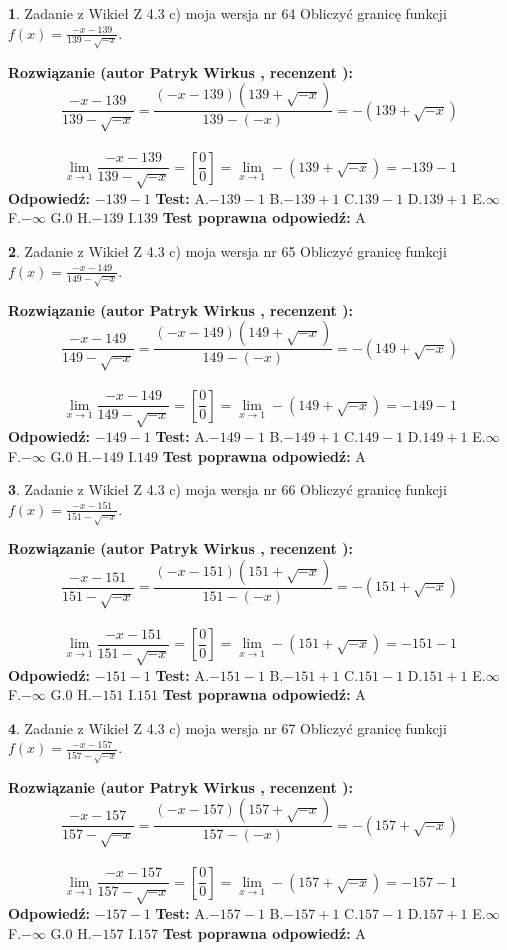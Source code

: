 \documentclass[12pt, a4paper]{article}
\theoremstyle{definition} %
\newtheorem{zad}{}
\newcommand{\zadStart}[1]{\begin{zad}#1\newline}
\newcommand{\zadStop}{\end{zad}}
\newcommand{\rozwStart}[2]{\noindent \textbf{Rozwiązanie (autor #1 , recenzent #2): }\newline}
\newcommand{\rozwStop}{\newline}
\newcommand{\odpStart}{\noindent \textbf{Odpowiedź:}\newline}
\newcommand{\odpStop}{\newline}
\newcommand{\testStart}{\noindent \textbf{Test:}\newline}
\newcommand{\testStop}{\newline}
\newcommand{\kluczStart}{\noindent \textbf{Test poprawna odpowiedź:}\newline}
\newcommand{\kluczStop}{\newline}
\begin{document}
\zadStart{Zadanie z Wikieł Z 4.3 c) moja wersja nr 64}
Obliczyć granicę funkcji $f(x)=\frac{-x-139}{139-\sqrt{-x}}$.
\zadStop
\rozwStart{Patryk Wirkus}{}
$$\frac{-x-139}{139-\sqrt{-x}}=\frac{(-x-139)(139+\sqrt{-x})}{139-(-x)}=-(139+\sqrt{-x})$$
\\
$$\lim\limits_{x\to1}\frac{-x-139}{139-\sqrt{-x}}=[\frac{0}{0}]=\lim\limits_{x\to1}-(139+\sqrt{-x}) =-139-1$$
\rozwStop
\odpStart
$-139-1$
\odpStop
\testStart
A.$-139-1$
B.$-139+1$
C.$139-1$
D.$139+1$
E.$\infty$
F.$-\infty$
G.$0$
H.$-139$
I.$139$
\testStop
\kluczStart
A
\kluczStop



\zadStart{Zadanie z Wikieł Z 4.3 c) moja wersja nr 65}
Obliczyć granicę funkcji $f(x)=\frac{-x-149}{149-\sqrt{-x}}$.
\zadStop
\rozwStart{Patryk Wirkus}{}
$$\frac{-x-149}{149-\sqrt{-x}}=\frac{(-x-149)(149+\sqrt{-x})}{149-(-x)}=-(149+\sqrt{-x})$$
\\
$$\lim\limits_{x\to1}\frac{-x-149}{149-\sqrt{-x}}=[\frac{0}{0}]=\lim\limits_{x\to1}-(149+\sqrt{-x}) =-149-1$$
\rozwStop
\odpStart
$-149-1$
\odpStop
\testStart
A.$-149-1$
B.$-149+1$
C.$149-1$
D.$149+1$
E.$\infty$
F.$-\infty$
G.$0$
H.$-149$
I.$149$
\testStop
\kluczStart
A
\kluczStop



\zadStart{Zadanie z Wikieł Z 4.3 c) moja wersja nr 66}
Obliczyć granicę funkcji $f(x)=\frac{-x-151}{151-\sqrt{-x}}$.
\zadStop
\rozwStart{Patryk Wirkus}{}
$$\frac{-x-151}{151-\sqrt{-x}}=\frac{(-x-151)(151+\sqrt{-x})}{151-(-x)}=-(151+\sqrt{-x})$$
\\
$$\lim\limits_{x\to1}\frac{-x-151}{151-\sqrt{-x}}=[\frac{0}{0}]=\lim\limits_{x\to1}-(151+\sqrt{-x}) =-151-1$$
\rozwStop
\odpStart
$-151-1$
\odpStop
\testStart
A.$-151-1$
B.$-151+1$
C.$151-1$
D.$151+1$
E.$\infty$
F.$-\infty$
G.$0$
H.$-151$
I.$151$
\testStop
\kluczStart
A
\kluczStop



\zadStart{Zadanie z Wikieł Z 4.3 c) moja wersja nr 67}
Obliczyć granicę funkcji $f(x)=\frac{-x-157}{157-\sqrt{-x}}$.
\zadStop
\rozwStart{Patryk Wirkus}{}
$$\frac{-x-157}{157-\sqrt{-x}}=\frac{(-x-157)(157+\sqrt{-x})}{157-(-x)}=-(157+\sqrt{-x})$$
\\
$$\lim\limits_{x\to1}\frac{-x-157}{157-\sqrt{-x}}=[\frac{0}{0}]=\lim\limits_{x\to1}-(157+\sqrt{-x}) =-157-1$$
\rozwStop
\odpStart
$-157-1$
\odpStop
\testStart
A.$-157-1$
B.$-157+1$
C.$157-1$
D.$157+1$
E.$\infty$
F.$-\infty$
G.$0$
H.$-157$
I.$157$
\testStop
\kluczStart
A
\kluczStop
\end{document}
